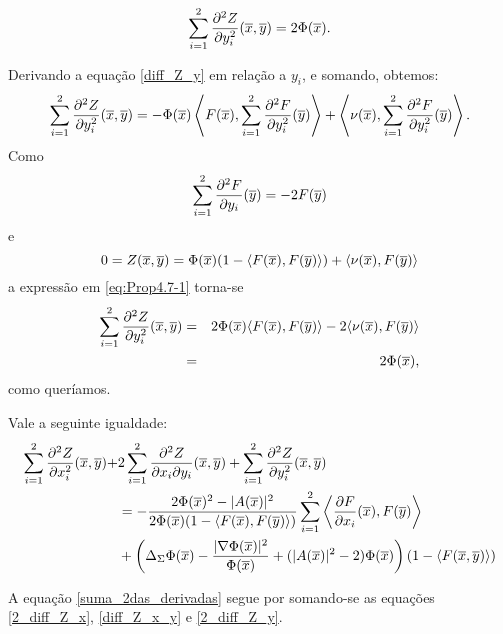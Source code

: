 \begin{proposicao}
	\begin{equation}\label{2_diff_Z_y}
	\sum_{i=1}^2 \frac{\partial^2 Z}{\partial y_i^2}(\overline{x},\overline{y}) = 2 \Phi(\overline{x}).
	\end{equation}
\end{proposicao}
\begin{demonstracao}
	Derivando a equa\c c\~ao \eqref{diff_Z_y} em rela\c c\~ao a $y_i$,
	e somando, obtemos:
	\begin{eqnarray} \label{eq:Prop4.7-1}
	\sum_{i=1}^2 \frac{\partial^2 Z}{\partial y_i^2}(\overline{x},\overline{y}) = - \Phi(\overline{x}) \left\langle F(\overline{x}), \sum_{i=1}^2 \frac{\partial^2 F}{\partial y_i^2}(\overline{y}) \right\rangle + \left\langle \nu(\overline{x}), \sum_{i=1}^2 \frac{\partial^2 F}{\partial y_i^2}(\overline{y}) \right\rangle.
	\end{eqnarray}	
	Como
	\[
	\sum_{i=1}^2 \frac{\partial^2 F}{\partial y_i}(\overline{y}) = -2 F(\overline{y})
	\]
	e
	\[
	0 = Z(\overline{x},\overline{y}) = \Phi(\overline{x})(1 - \langle F(\overline{x}), F(\overline{y}) \rangle) + 
	\langle \nu(\overline{x}), F(\overline{y}) \rangle
	\] 
	a express\~ao em \eqref{eq:Prop4.7-1} torna-se
	\begin{eqnarray*}
		\sum_{i=1}^2 \frac{\partial^2 Z}{\partial y_i^2}(\overline{x},\overline{y}) &=&
		2 \Phi(\overline{x}) \langle F(\overline{x}), F(\overline{y}) \rangle - 2 \langle \nu(\overline{x}), F(\overline{y}) 
		\rangle \\
		&=&
		2 \Phi(\overline{x}),
	\end{eqnarray*}
	como quer\'iamos.
\end{demonstracao}


\begin{proposicao}
	Vale a seguinte igualdade:
	\begin{eqnarray} \label{suma_2das_derivadas}
	\begin{aligned}
	\sum_{i=1}^2 \frac{\partial^2 Z}{\partial x_i^2}(\overline{x},\overline{y}) + & 
	2 \sum_{i=1}^2 \frac{\partial^2 Z}{\partial x_i \partial y_i}(\overline{x},\overline{y}) + \sum_{i=1}^2 \frac{\partial^2 Z}{\partial y_i^2}(\overline{x},\overline{y}) \\
	&= 
	- \frac{2 \Phi(\overline{x})^2- |A(\overline{x})|^2}{2 \Phi(\overline{x})
		(1 - \langle F(\overline{x}),F(\overline{y}) \rangle)} \sum_{i=1}^2
	\left\langle \frac{\partial F}{\partial x_i}(\overline{x}), F(\overline{y}) \right\rangle \\
	&+
	\left( \Delta_{\Sigma} \Phi(\overline{x}) - \frac{| \nabla \Phi(\overline{x}) |^2}
	{\Phi(\overline{x})} + ( | A(\overline{x}) |^2 - 2 ) \Phi(\overline{x}) \right)
	\left(1 - \langle F(\overline{x},\overline{y}) \rangle\right)
	\end{aligned}
	\end{eqnarray}
\end{proposicao}
\begin{demonstracao}
	A equa\c c\~ao \eqref{suma_2das_derivadas} segue por somando-se
	as equa\c c\~oes \eqref{2_diff_Z_x}, \eqref{diff_Z_x_y} e \eqref{2_diff_Z_y}.
\end{demonstracao}

